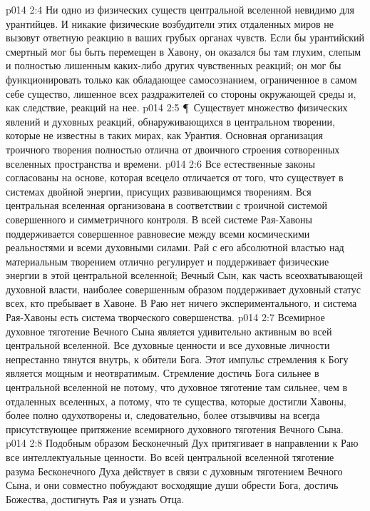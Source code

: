 \vs p014 2:4 Ни одно из физических существ центральной вселенной невидимо для урантийцев. И никакие физические возбудители этих отдаленных миров не вызовут ответную реакцию в ваших грубых органах чувств. Если бы урантийский смертный мог бы быть перемещен в Хавону, он оказался бы там глухим, слепым и полностью лишенным каких\hyp{}либо других чувственных реакций; он мог бы функционировать только как обладающее самосознанием, ограниченное в самом себе существо, лишенное всех раздражителей со стороны окружающей среды и, как следствие, реакций на нее.
\vs p014 2:5 \P\ Существует множество физических явлений и духовных реакций, обнаруживающихся в центральном творении, которые не известны в таких мирах, как Урантия. Основная организация троичного творения полностью отлична от двоичного строения сотворенных вселенных пространства и времени.
\vs p014 2:6 Все естественные законы согласованы на основе, которая всецело отличается от того, что существует в системах двойной энергии, присущих развивающимся творениям. Вся центральная вселенная организована в соответствии с троичной системой совершенного и симметричного контроля. В всей системе Рая\hyp{}Хавоны поддерживается совершенное равновесие между всеми космическими реальностями и всеми духовными силами. Рай с его абсолютной властью над материальным творением отлично регулирует и поддерживает физические энергии в этой центральной вселенной; Вечный Сын, как часть всеохватывающей духовной власти, наиболее совершенным образом поддерживает духовный статус всех, кто пребывает в Хавоне. В Раю нет ничего экспериментального, и система Рая\hyp{}Хавоны есть система творческого совершенства.
\vs p014 2:7 Всемирное духовное тяготение Вечного Сына является удивительно активным во всей центральной вселенной. Все духовные ценности и все духовные личности непрестанно тянутся внутрь, к обители Бога. Этот импульс стремления к Богу является мощным и неотвратимым. Стремление достичь Бога сильнее в центральной вселенной не потому, что духовное тяготение там сильнее, чем в отдаленных вселенных, а потому, что те существа, которые достигли Хавоны, более полно одухотворены и, следовательно, более отзывчивы на всегда присутствующее притяжение всемирного духовного тяготения Вечного Сына.
\vs p014 2:8 Подобным образом Бесконечный Дух притягивает в направлении к Раю все интеллектуальные ценности. Во всей центральной вселенной тяготение разума Бесконечного Духа действует в связи с духовным тяготением Вечного Сына, и они совместно побуждают восходящие души обрести Бога, достичь Божества, достигнуть Рая и узнать Отца.
